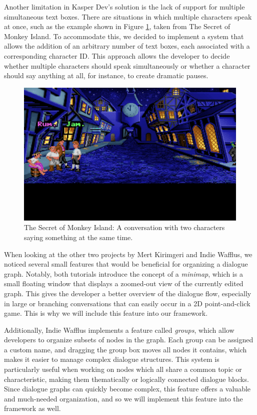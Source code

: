 Another limitation in Kasper Dev's solution is the lack of support for multiple simultaneous text boxes. There are situations in which multiple characters speak at once, such as the example shown in Figure \ref{fig:DialogueConvo}, taken from The Secret of Monkey Island. To accommodate this, we decided to implement a system that allows the addition of an arbitrary number of text boxes, each associated with a corresponding character ID. This approach allows the developer to decide whether multiple characters should speak simultaneously or whether a character should say anything at all, for instance, to create dramatic pauses.

\begin{figure}[H]
\centering
\includegraphics[width=.8\linewidth]{img/Dialogue-talking_at_the_same_time.png}
\caption{The Secret of Monkey Island: A conversation with two characters saying something at the same time.}
\label{fig:DialogueConvo}
\end{figure}

When looking at the other two projects by Mert Kirimgeri and Indie Wafflus, we noticed several small features that would be beneficial for organizing a dialogue graph. Notably, both tutorials introduce the concept of a \textit{minimap}, which is a small floating window that displays a zoomed-out view of the currently edited graph. This gives the developer a better overview of the dialogue flow, especially in large or branching conversations that can easily occur in a 2D point-and-click game. This is why we will include this feature into our framework. 

Additionally, Indie Wafflus implements a feature called \textit{groups}, which allow developers to organize subsets of nodes in the graph. Each group can be assigned a custom name, and dragging the group box moves all nodes it contains, which makes it easier to manage complex dialogue structures. This system is particularly useful when working on nodes which all share a common topic or characteristic, making them thematically or logically connected dialogue blocks. Since dialogue graphs can quickly become complex, this feature offers a valuable and much-needed organization, and so we will implement this feature into the framework as well. 